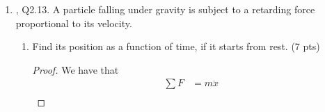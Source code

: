 \documentclass[../psets.tex]{subfiles}
\begin{document}
\begin{enumerate}
\begin{enumerate}
\begin{proof}
\begin{equation*}
                \tilde{\delta x}(t) = \delta x\cos(t\sqrt{\frac{2E(a\mu_2+b\mu_1)^2}{m}})
            \end{equation*}
            Finally, we can apply the coordinate transformations
            \begin{align*}
                x_{-a/\mu_1} &= \tilde{\delta x}-\frac{a}{\mu_1}\\
                x_{b/\mu_2} &= \tilde{\delta x}+\frac{b}{\mu_2}
            \end{align*}
            which can be inferred from the sketch in part (A). Given these, we can state the final trajectories for particle of mass $m$ released from rest a distance $\delta x$ from $x=-a/\mu_1$ and $x=b/\mu_2$, respectively, as
            \begin{align*}
                \Aboxed{x_{-a/\mu_1}(t) &= \delta x\cos(t\sqrt{\frac{2E(a\mu_2+b\mu_1)^2}{m}})-\frac{a}{\mu_1}}&
                \Aboxed{x_{b/\mu_2} &= \delta x\cos(t\sqrt{\frac{2E(a\mu_2+b\mu_1)^2}{m}})+\frac{b}{\mu_2}}
            \end{align*}
        \end{proof}
    \end{enumerate}
    \item \textcite{bib:KibbleBerkshire}, Q2.13. A particle falling under gravity is subject to a retarding force proportional to its velocity.
    \begin{enumerate}
        \item Find its position as a function of time, if it starts from rest. (7 pts)
        \begin{proof}
            We have that
            \begin{align*}
                \sum F &= m\ddot{x}\\

\end{align*}
\end{proof}
\end{enumerate}
\end{enumerate}
\end{document}
